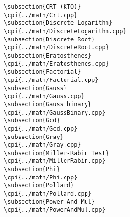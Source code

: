 {\begin{verbatim}
\subsection{CRT (KTO)}
\cpi{../math/Crt.cpp}
\subsection{Discrete Logarithm}
\cpi{../math/DiscreteLogarithm.cpp}
\subsection{Discrete Root}
\cpi{../math/DiscreteRoot.cpp}
\subsection{Eratosthenes}
\cpi{../math/Eratosthenes.cpp}
\subsection{Factorial}
\cpi{../math/Factorial.cpp}
\subsection{Gauss}
\cpi{../math/Gauss.cpp}
\subsection{Gauss binary}
\cpi{../math/GaussBinary.cpp}
\subsection{Gcd}
\cpi{../math/Gcd.cpp}
\subsection{Gray}
\cpi{../math/Gray.cpp}
\subsection{Miller-Rabin Test}
\cpi{../math/MillerRabin.cpp}
\subsection{Phi}
\cpi{../math/Phi.cpp}
\subsection{Pollard}
\cpi{../math/Pollard.cpp}
\subsection{Power And Mul}
\cpi{../math/PowerAndMul.cpp}

\end{verbatim}}
